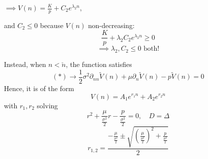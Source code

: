 \begin{remark}
    $\implies V(n) = \frac{K}{p} + C_2 e^{\lambda_2 n}$,
    
    and $C_2 \leq 0$ because $V(n)$ non-decreasing:
    \[ \frac{K}{p} + \lambda_2 C_2 e^{\lambda_2 n} \geq 0 \]
    \[ \implies \lambda_2, C_2 \leq 0 \text{ both!} \]
    
    Instead, when $n < \check{n}$, the function satisfies
    \[ (*) \to \frac{1}{2} \sigma^2 \partial_{nn} \tilde{V}(n) + \mu \partial_n \tilde{V}(n) - p \tilde{V}(n) = 0 \]
    Hence, it is of the form
    \[ V(n) = A_1 e^{r_1 n} + A_2 e^{r_2 n} \]
    with $r_1, r_2$ solving
    \[ r^2 + \frac{\mu}{\frac{\sigma^2}{2}} r - \frac{p}{\frac{\sigma^2}{2}} = 0, \quad D = \Delta \]
    \[ r_{1,2} = \frac{-\frac{\mu}{\frac{\sigma^2}{2}} \pm \sqrt{\left(\frac{\mu}{\frac{\sigma^2}{2}}\right)^2 + \frac{p}{\frac{\sigma^2}{2}}}}{2} \]
\end{remark}

